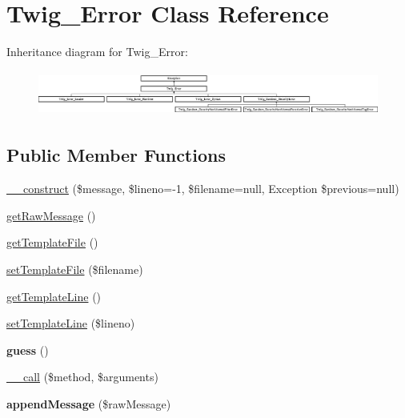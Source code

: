 \hypertarget{classTwig__Error}{}\section{Twig\+\_\+\+Error Class Reference}
\label{classTwig__Error}
Inheritance diagram for Twig\+\_\+\+Error\+:\begin{figure}[H]
\begin{center}
\leavevmode
\includegraphics[height=1.498328cm]{classTwig__Error}
\end{center}
\end{figure}
\subsection*{Public Member Functions}
\begin{DoxyCompactItemize}
\item 
\hyperlink{classTwig__Error_a2391d586439c458511df82e6a413aae6}{\+\_\+\+\_\+construct} (\$message, \$lineno=-\/1, \$filename=null, Exception \$previous=null)
\item 
\hyperlink{classTwig__Error_a0c952ef094e704d6abb21051eba2ff89}{get\+Raw\+Message} ()
\item 
\hyperlink{classTwig__Error_a1810677fa05ba8e4688713740ce621c8}{get\+Template\+File} ()
\item 
\hyperlink{classTwig__Error_ace02b96dbc6dd18766c500ac1afdfd40}{set\+Template\+File} (\$filename)
\item 
\hyperlink{classTwig__Error_aceee83e10acb5fb3483bbc5115ef8b85}{get\+Template\+Line} ()
\item 
\hyperlink{classTwig__Error_a42731555350018caf355bfcf3d788abf}{set\+Template\+Line} (\$lineno)
\item 
{\bfseries guess} ()\hypertarget{classTwig__Error_ad3169c2a35cbbc4c149f19981c3875ac}{}\label{classTwig__Error_ad3169c2a35cbbc4c149f19981c3875ac}

\item 
\hyperlink{classTwig__Error_a506fbfacb0d44dc22d0bba303279a4f3}{\+\_\+\+\_\+call} (\$method, \$arguments)
\item 
{\bfseries append\+Message} (\$raw\+Message)\hypertarget{classTwig__Error_a17e74331397997df66703133c20a350c}{}\label{classTwig__Error_a17e74331397997df66703133c20a350c}

\end{DoxyCompactItemize}
